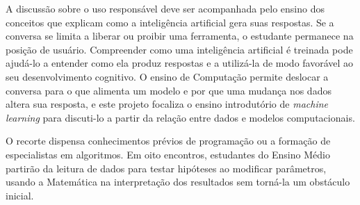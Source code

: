A discussão sobre o uso responsável deve ser acompanhada pelo ensino dos conceitos que explicam como a inteligência artificial gera suas respostas. Se a conversa se limita a liberar ou proibir uma ferramenta, o estudante permanece na posição de usuário. Compreender como uma inteligência artificial é treinada pode ajudá-lo a entender como ela produz respostas e a utilizá-la de modo favorável ao seu desenvolvimento cognitivo. O ensino de Computação permite deslocar a conversa para o que alimenta um modelo e por que uma mudança nos dados altera sua resposta, e este projeto focaliza o ensino introdutório de \textit{machine learning} para discuti-lo a partir da relação entre dados e modelos computacionais.

O recorte dispensa conhecimentos prévios de programação ou a formação de especialistas em algoritmos. Em oito encontros, estudantes do Ensino Médio partirão da leitura de dados para testar hipóteses ao modificar parâmetros, usando a Matemática na interpretação dos resultados sem torná-la um obstáculo inicial.


